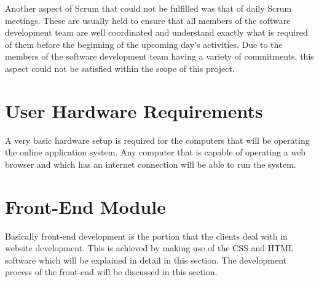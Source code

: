 \documentclass[journal]{IEEEtran}
\begin{document}
\hfill \break Another aspect of Scrum that could not be fulfilled was that of daily Scrum meetings. These are usually held to ensure that all members of the software development team are well coordinated and understand exactly what is required of them before the beginning of the upcoming day's activities. Due to the members of the software development team having a variety of commitments, this aspect could not be satisfied within the scope of this project.


\section{User Hardware Requirements}

A very basic hardware setup is required for the computers that will be operating the online application system. Any computer that is capable of operating a web browser and which has an internet connection will be able to run the system.


\clearpage


\section{Front-End Module}
Basically front-end development is the portion that the clients deal with in website development. This is achieved by making use of the CSS and HTML software which will be explained in detail in this section. The development process of the front-end will be discussed in this section.


\end{document}
